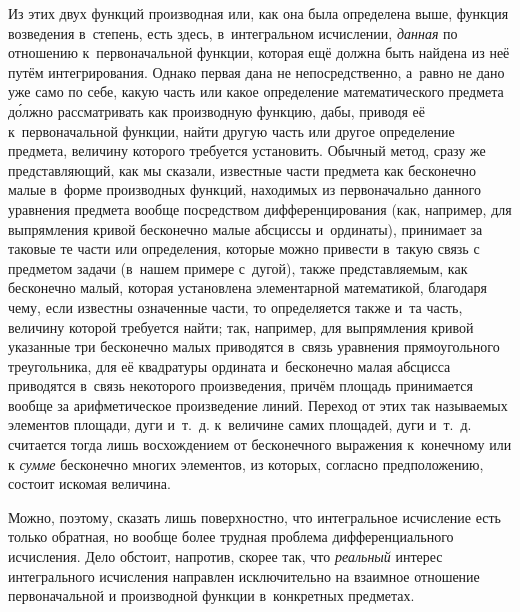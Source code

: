 Из этих двух функций производная или, как она была определена выше, функция
возведения в~степень, есть здесь, в~интегральном исчислении, {\em данная} по
отношению к~первоначальной функции, которая ещё должна быть найдена из неё
путём интегрирования. Однако первая дана не непосредственно, а~равно не дано
уже само по себе, какую часть или какое определение математического предмета
д\'{о}лжно рассматривать как производную функцию, дабы, приводя её
к~первоначальной функции, найти другую часть или другое определение
предмета, величину которого требуется установить. Обычный
метод, сразу же представляющий, как мы сказали, известные части предмета как
бесконечно малые в~форме производных функций, находимых из первоначально
данного уравнения предмета вообще посредством дифференцирования (как, например,
для выпрямления кривой бесконечно малые абсциссы и~ординаты), принимает за
таковые те части или определения, которые можно привести в~такую связь с
предметом задачи (в~нашем примере с~дугой), также представляемым, как
бесконечно малый, которая установлена элементарной математикой, благодаря чему,
если известны означенные части, то определяется также и~та часть, величину
которой требуется найти; так, например, для выпрямления кривой указанные три
бесконечно малых приводятся в~связь уравнения прямоугольного треугольника, для
её квадратуры ордината и~бесконечно малая абсцисса приводятся в~связь
некоторого произведения, причём площадь принимается вообще за арифметическое
произведение линий. Переход от этих так называемых элементов площади, дуги
и~т.~д. к~величине самих площадей, дуги и~т.~д. считается тогда лишь
восхождением от бесконечного выражения к~конечному или к {\em сумме} бесконечно
многих элементов, из которых, согласно предположению, состоит искомая величина.

Можно, поэтому, сказать лишь поверхностно, что интегральное исчисление есть
только обратная, но вообще более трудная проблема дифференциального исчисления.
Дело обстоит, напротив, скорее так, что {\em реальный} интерес интегрального
исчисления направлен исключительно на взаимное отношение первоначальной и
производной функции в~конкретных предметах.

